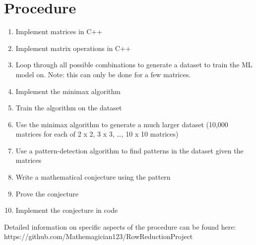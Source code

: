 \documentclass{article}
\begin{document}
\section*{Procedure}
\begin{enumerate}
\item Implement matrices in C++
\item Implement matrix operations in C++
\item Loop through all possible combinations to generate a dataset to train       the ML model on. Note: this can only be done for a few matrices.
\item Implement the minimax algorithm
\item Train the algorithm on the dataset
\item Use the minimax algorithm to generate a much larger dataset (10,000         matrices for each of 2 x 2, 3 x 3, …, 10 x 10 matrices)
\item Use a pattern-detection algorithm to find patterns in the dataset           given the matrices
\item Write a mathematical conjecture using the pattern 
\item Prove the conjecture
\item Implement the conjecture in code
\end{enumerate}

Detailed information on specific aspects of the procedure can be found here: \\ 
https://github.com/Mathemagician123/RowReductionProject
\end{document}
